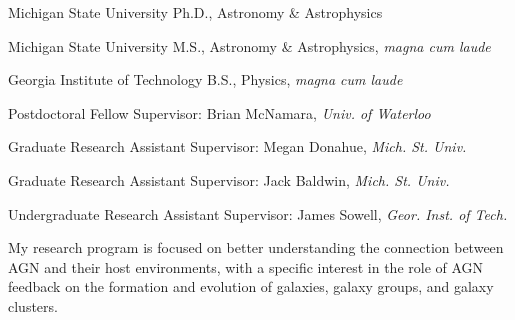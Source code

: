\documentclass[12pt]{cv}
\begin{document}
\begin{llist}


Michigan State University
Ph.D., Astronomy \& Astrophysics

Michigan State University
M.S., Astronomy \& Astrophysics, \textit{magna cum laude}

Georgia Institute of Technology
B.S., Physics, \textit{magna cum laude}



Postdoctoral Fellow
Supervisor: Brian McNamara, {\textit{Univ. of Waterloo}}

Graduate Research Assistant
Supervisor: Megan Donahue, {\textit{Mich. St. Univ.}}

Graduate Research Assistant
Supervisor: Jack Baldwin, {\textit{Mich. St. Univ.}}

Undergraduate Research Assistant
Supervisor: James Sowell, {\textit{Geor. Inst. of Tech.}}



My research program is focused on better understanding the connection
between AGN and their host environments, with a specific interest in
the role of AGN feedback on the formation and evolution of galaxies,
galaxy groups, and galaxy clusters.


\end{llist}
\end{document}
